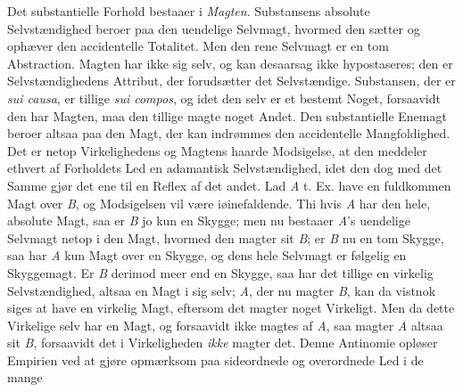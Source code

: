 \documentclass[12pt]{book}
\newcommand{\opage}[1]{\marginnote{\footnotesize\textit{[#1]}}}
\begin{document}
Det substantielle Forhold bestaaer i \emph{Magten}. Substansens absolute
Selvstændighed beroer paa den uendelige Selvmagt, hvormed den sætter og ophæver den
accidentelle Totalitet. Men den rene Selvmagt er en tom Abstraction. Magten har ikke
sig selv, og kan desaarsag ikke hypostaseres; den er Selvstændighedens Attribut, der
forudsætter det Selvstændige. Substansen, der er \textit{sui causa}, er tillige
\textit{sui compos}, og idet den selv er et bestemt Noget, forsaavidt den har Magten,
maa den tillige magte noget Andet. Den substantielle Enemagt beroer altsaa paa den
Magt, der kan indrømmes den accidentelle Mangfoldighed. Det er netop Virkelighedens og
Magtens haarde Modsigelse, at den meddeler ethvert af Forholdets Led en adamantisk
Selvstændighed, idet den dog med det Samme gjør det ene til en Reflex af det andet. Lad
\textit{A} t. Ex. have en fuldkommen Magt over \textit{B}, og Modsigelsen vil være
iøinefaldende. Thi hvis \textit{A} har den hele, absolute Magt, saa er \textit{B} jo
kun en Skygge; men nu bestaaer \textit{A}'s uendelige Selvmagt netop i den Magt,
hvormed den magter sit \textit{B}; er \textit{B} nu en tom Skygge, saa har \textit{A}
kun Magt over en Skygge, og dens hele Selvmagt er følgelig en Skyggemagt. Er
\textit{B} derimod meer end en Skygge, saa har det tillige en virkelig
Selvstændighed, altsaa en Magt i sig selv;
\opage{167} \textit{A}, der nu magter \textit{B}, kan da vistnok siges at have en virkelig Magt,
eftersom det magter noget Virkeligt. Men da dette Virkelige selv har en Magt, og
forsaavidt ikke magtes af \textit{A}, saa magter \textit{A} altsaa sit \textit{B},
forsaavidt det i Virkeligheden \emph{ikke} magter det. Denne Antinomie opløser
Empirien ved at gjøre opmærksom paa sideordnede og overordnede Led i de mange
\end{document}
